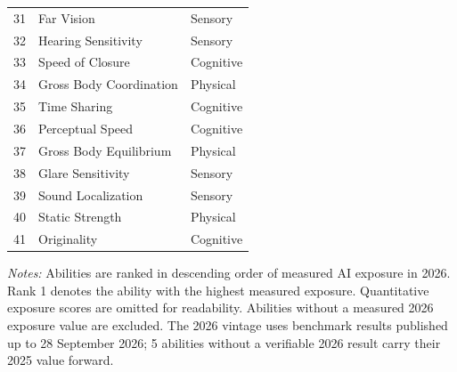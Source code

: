 \begin{table}[htbp]
\begin{tabular}{rll}
31 & Far Vision & Sensory \\
32 & Hearing Sensitivity & Sensory \\
33 & Speed of Closure & Cognitive \\
34 & Gross Body Coordination & Physical \\
35 & Time Sharing & Cognitive \\
36 & Perceptual Speed & Cognitive \\
37 & Gross Body Equilibrium & Physical \\
38 & Glare Sensitivity & Sensory \\
39 & Sound Localization & Sensory \\
40 & Static Strength & Physical \\
41 & Originality & Cognitive \\
\bottomrule\end{tabular}
\begin{minipage}{0.95\linewidth}\footnotesize \textit{Notes:} Abilities are ranked in descending order of measured AI exposure in 2026. Rank 1 denotes the ability with the highest measured exposure. Quantitative exposure scores are omitted for readability. Abilities without a measured 2026 exposure value are excluded. The 2026 vintage uses benchmark results published up to 28 September 2026; 5 abilities without a verifiable 2026 result carry their 2025 value forward.\end{minipage}
\end{table}
